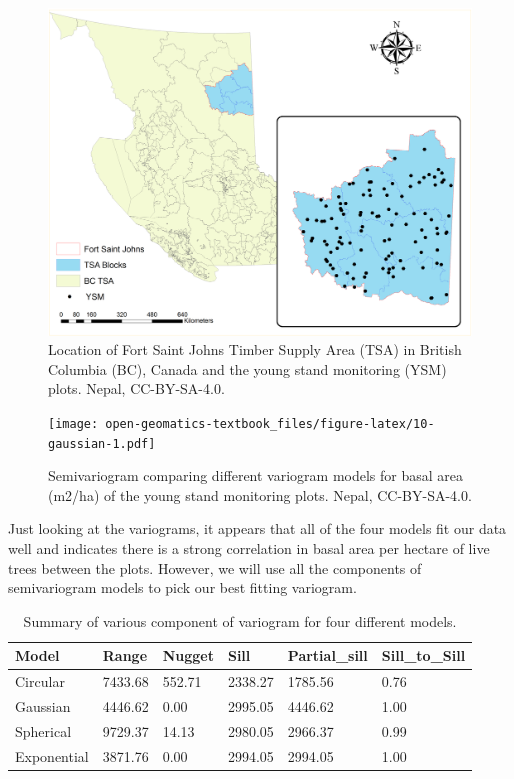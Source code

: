 \documentclass[
]{book}
\begin{document}
\begin{figure}
\includegraphics[width=45.83in]{images/10-FSJ-plot} \caption{Location of Fort Saint Johns Timber Supply Area (TSA) in British Columbia (BC), Canada and the young stand monitoring (YSM) plots. Nepal, CC-BY-SA-4.0.}\label{fig:10-FSJ-plot}
\end{figure}

\begin{figure}
\centering
\texttt{[image: open-geomatics-textbook\_files/figure-latex/10-gaussian-1.pdf]}
\caption{\label{fig:10-gaussian}Semivariogram comparing different variogram models for basal area (m2/ha) of the young stand monitoring plots. Nepal, CC-BY-SA-4.0.}
\end{figure}

Just looking at the variograms, it appears that all of the four models fit our data well and indicates there is a strong correlation in basal area per hectare of live trees between the plots. However, we will use all the components of semivariogram models to pick our best fitting variogram.

\begin{table}

\caption{\label{tab:10-circular-2}Summary of various component of variogram for four different models.}
\centering
\begin{tabular}[t]{l|l|l|l|l|l}
\hline
Model & Range & Nugget & Sill & Partial\_sill & Sill\_to\_Sill\\
\hline
Circular & 7433.68 & 552.71 & 2338.27 & 1785.56 & 0.76\\
\hline
Gaussian & 4446.62 & 0.00 & 2995.05 & 4446.62 & 1.00\\
\hline
Spherical & 9729.37 & 14.13 & 2980.05 & 2966.37 & 0.99\\
\hline
Exponential & 3871.76 & 0.00 & 2994.05 & 2994.05 & 1.00\\
\hline
\end{tabular}
\end{table}
\end{document}
